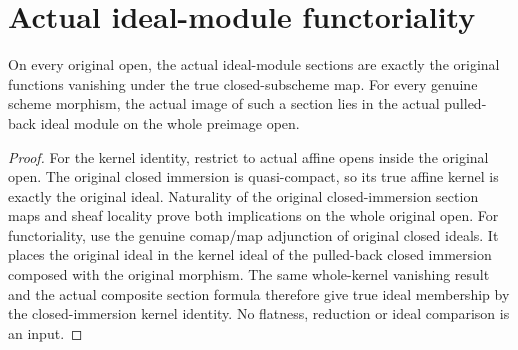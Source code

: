 \section{Actual ideal-module functoriality}

\begin{lemma}
\label{lem:actual-ideal-module-whole-kernel}
\leanok
On every original open, the actual ideal-module sections are exactly
the original functions vanishing under the true closed-subscheme map.
For every genuine scheme morphism, the actual image of such a section
lies in the actual pulled-back ideal module on the whole preimage open.
\end{lemma}
\begin{proof}
For the kernel identity, restrict to actual affine opens inside the
original open.  The original closed immersion is quasi-compact, so
its true affine kernel is exactly the original ideal.  Naturality of
the original closed-immersion section maps and sheaf locality prove
both implications on the whole original open.  For functoriality,
use the genuine comap/map adjunction of original closed ideals.  It
places the original ideal in the kernel ideal of the pulled-back closed
immersion composed with the original morphism.  The same whole-kernel
vanishing result and the actual composite section formula therefore
give true ideal membership by the closed-immersion kernel identity.
No flatness, reduction or ideal comparison is an input.
\end{proof}

